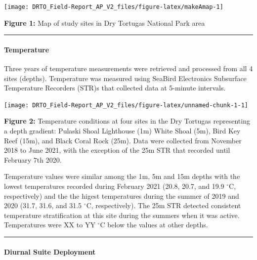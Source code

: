 \documentclass[]{article}
\let\oldparagraph\paragraph
\renewcommand{\paragraph}[1]{\oldparagraph{#1}\mbox{}}
\begin{document}
\begin{center}\texttt{[image: DRTO\_Field-Report\_AP\_V2\_files/figure-latex/makeAmap-1]} \end{center}

 \textbf{Figure 1:} Map of study sites in Dry Tortugas National Park
area

\begin{center}\rule{0.5\linewidth}{0.5pt}\end{center}

\hypertarget{temperature}{%
\paragraph{Temperature}\label{temperature}}

Three years of temperature measurements were retrieved and processed
from all 4 sites (depths). Temperature was measured using SeaBird
Electronics Subsurface Temperature Recorders (STR)s that collected data
at 5-minute intervals.

\begin{center}\texttt{[image: DRTO\_Field-Report\_AP\_V2\_files/figure-latex/unnamed-chunk-1-1]} \end{center}

 \textbf{Figure 2:} Temperature conditions at four sites in the Dry
Tortugas representing a depth gradient: Pulaski Shoal Lighthouse (1m)
White Shoal (5m), Bird Key Reef (15m), and Black Coral Rock (25m). Data
were collected from November 2018 to June 2021, with the exception of
the 25m STR that recorded until February 7th 2020.

Temperature values were similar among the 1m, 5m and 15m depths with the
lowest temperatures recorded during February 2021 (20.8, 20.7, and 19.9
\(^\circ\)C, respectively) and the the higest temperatures during the
summer of 2019 and 2020 (31.7, 31.6, and 31.5 \(^\circ\)C,
respectively). The 25m STR detected consistent temperature
stratification at this site during the summers when it was active.
Temperatures were XX to YY \(^\circ\)C below the values at other depths.

\begin{center}\rule{0.5\linewidth}{0.5pt}\end{center}

\hypertarget{diurnal-suite-deployment}{%
\paragraph{Diurnal Suite Deployment}\label{diurnal-suite-deployment}}
\end{document}

